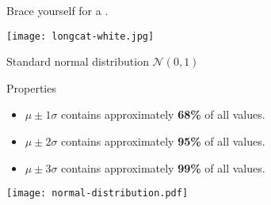 \documentclass[t]{beamer}
\begin{document}
	
	\begin{frame}[t,plain]
		
		\vspace{.3\paperwidth}
		\begin{center}
			{\Large Brace yourself for a .}
		\end{center}
		
		\vspace{1em}
		\begin{flushright}
			\texttt{[image: longcat-white.jpg]}		
		\end{flushright}

	\end{frame}

	\begin{frame}[t]{Standard normal distribution $\mathcal{N}(0,1)$}
	
	\begin{block}{Properties}
		\begin{itemize}
			\item $\mu \pm 1\sigma$ contains approximately \textbf{68\%} of all values.
			\item $\mu \pm 2\sigma$ contains approximately \textbf{95\%} of all values.
			\item $\mu \pm 3\sigma$ contains approximately \textbf{99\%} of all values.
		\end{itemize}
	\end{block}
	
	\begin{center}
		\texttt{[image: normal-distribution.pdf]}
	\end{center}
		
	\end{frame}
	
\end{document}
